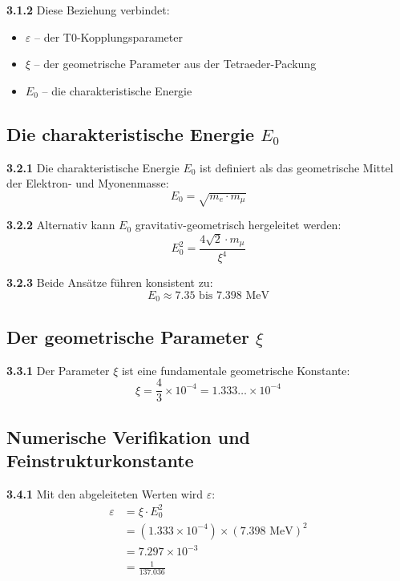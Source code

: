 \documentclass[12pt,a4paper]{article}
\newcommand{\Ezero}{E_0}
\newcommand{\xipar}{\xi}
\begin{document}
	\noindent \textbf{3.1.2} Diese Beziehung verbindet:
	\begin{itemize}
		\item $\varepsilon$ -- der T0-Kopplungsparameter
		\item $\xipar$ -- der geometrische Parameter aus der Tetraeder-Packung
		\item $\Ezero$ -- die charakteristische Energie
	\end{itemize}
	
	\subsection{Die charakteristische Energie $\Ezero$}
	
	\noindent \textbf{3.2.1} Die charakteristische Energie $\Ezero$ ist definiert als das geometrische Mittel der Elektron- und Myonenmasse:
	\begin{equation}
		\Ezero = \sqrt{m_e \cdot m_\mu}
		\label{eq:E0_geometric_mean}
	\end{equation}
	
	\noindent \textbf{3.2.2} Alternativ kann $\Ezero$ gravitativ-geometrisch hergeleitet werden:
	\begin{equation}
		\Ezero^2 = \frac{4\sqrt{2} \cdot m_\mu}{\xipar^4}
		\label{eq:E0_gravitational}
	\end{equation}
	
	\noindent \textbf{3.2.3} Beide Ansätze führen konsistent zu:
	\begin{equation}
		\Ezero \approx 7.35 \text{ bis } 7.398 \text{ MeV}
	\end{equation}
	
	\subsection{Der geometrische Parameter $\xipar$}
	
	\noindent \textbf{3.3.1} Der Parameter $\xipar$ ist eine fundamentale geometrische Konstante:
	\begin{equation}
		\xipar = \frac{4}{3} \times 10^{-4} = 1.333\ldots \times 10^{-4}
		\label{eq:xi_value}
	\end{equation}
	
	\subsection{Numerische Verifikation und Feinstrukturkonstante}
	
	\noindent \textbf{3.4.1} Mit den abgeleiteten Werten wird $\varepsilon$:
	\begin{align}
		\varepsilon &= \xipar \cdot \Ezero^2 \\
		&= (1.333 \times 10^{-4}) \times (7.398 \text{ MeV})^2 \\
		&= 7.297 \times 10^{-3} \\
		&= \frac{1}{137.036}
		\label{eq:epsilon_numerical}
	\end{align}
	
\end{document}
